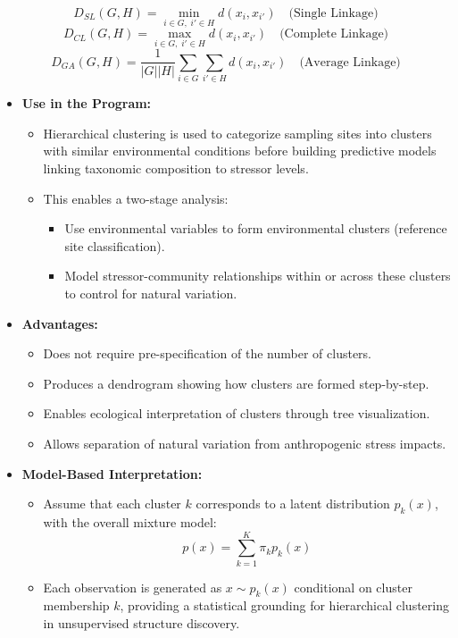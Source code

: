 \[ D_{SL}(G, H) = \min_{i \in G,\; i' \in H} d(x_i, x_{i'}) \quad \text{(Single Linkage)} \]
\[ D_{CL}(G, H) = \max_{i \in G,\; i' \in H} d(x_i, x_{i'}) \quad \text{(Complete Linkage)} \]
\[ D_{GA}(G, H) = \frac{1}{|G||H|} \sum_{i \in G} \sum_{i' \in H} d(x_i, x_{i'}) \quad \text{(Average Linkage)} \] 

\begin{itemize}
    \item \textbf{Use in the Program:}
    \begin{itemize}
        \item Hierarchical clustering is used to categorize sampling sites into clusters with similar environmental conditions before building predictive models linking taxonomic composition to stressor levels.
        \item This enables a two-stage analysis:
        \begin{itemize}
            \item Use environmental variables to form environmental clusters (reference site classification).
            \item Model stressor-community relationships within or across these clusters to control for natural variation.
        \end{itemize}
    \end{itemize}
    \item \textbf{Advantages:}
    \begin{itemize}
        \item Does not require pre-specification of the number of clusters.
        \item Produces a dendrogram showing how clusters are formed step-by-step.
        \item Enables ecological interpretation of clusters through tree visualization.
        \item Allows separation of natural variation from anthropogenic stress impacts.
    \end{itemize}
    \item \textbf{Model-Based Interpretation:}
    \begin{itemize}
        \item Assume that each cluster \( k \) corresponds to a latent distribution \( p_k(x) \), with the overall mixture model:
        \[
        p(x) = \sum_{k=1}^K \pi_k p_k(x)
        \]
        \item Each observation is generated as \( x \sim p_k(x) \) conditional on cluster membership \( k \), providing a statistical grounding for hierarchical clustering in unsupervised structure discovery.
    \end{itemize}
\end{itemize}


